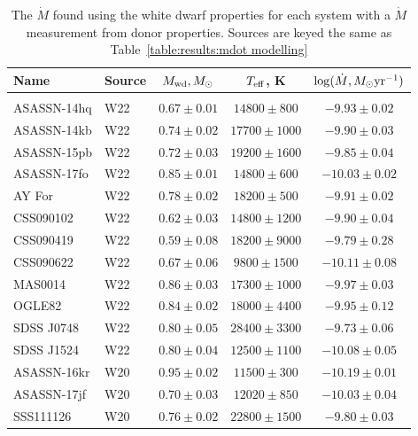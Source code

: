 \begin{table}
    \centering
    \caption{The $\dot M$ found using the white dwarf properties for each system with a $\dot M$ measurement from donor properties. Sources are keyed the same as Table~\ref{table:results:mdot modelling}}
    \label{table:results:Mdot from white dwarf parameters}
    \begin{tabular}{llccc}
        \hline
        \textbf{Name} & \textbf{Source} & \textbf{$M_{\rm wd}, M_\odot$} & \textbf{$T_{\rm eff}$, K} & \textbf{$\log (\dot M, M_\odot {\rm yr}^{-1})$} \\
        \hline \hline \\
        ASASSN-14hq      &  W22  & $0.67 \pm 0.01$ & $14800\pm   800$ & $ -9.93 \pm 0.02$ \\
        ASASSN-14kb      &  W22  & $0.74 \pm 0.02$ & $17700\pm  1000$ & $ -9.90 \pm 0.03$ \\
        ASASSN-15pb      &  W22  & $0.72 \pm 0.03$ & $19200\pm  1600$ & $ -9.85 \pm 0.04$ \\
        ASASSN-17fo      &  W22  & $0.85 \pm 0.01$ & $14800\pm   600$ & $-10.03 \pm 0.02$ \\
        AY For           &  W22  & $0.78 \pm 0.02$ & $18200\pm   500$ & $ -9.91 \pm 0.02$ \\
        CSS090102        &  W22  & $0.62 \pm 0.03$ & $14800\pm  1200$ & $ -9.90 \pm 0.04$ \\
        CSS090419        &  W22  & $0.59 \pm 0.08$ & $18200\pm  9000$ & $ -9.79 \pm 0.28$ \\
        CSS090622        &  W22  & $0.67 \pm 0.06$ & $ 9800\pm  1500$ & $-10.11 \pm 0.08$ \\
        MAS0014          &  W22  & $0.86 \pm 0.03$ & $17300\pm  1000$ & $ -9.97 \pm 0.03$ \\
        OGLE82           &  W22  & $0.84 \pm 0.02$ & $18000\pm  4400$ & $ -9.95 \pm 0.12$ \\
        SDSS J0748       &  W22  & $0.80 \pm 0.05$ & $28400\pm  3300$ & $ -9.73 \pm 0.06$ \\
        SDSS J1524       &  W22  & $0.80 \pm 0.04$ & $12500\pm  1100$ & $-10.08 \pm 0.05$ \\
        ASASSN-16kr      &  W20  & $0.95 \pm 0.02$ & $11500\pm   300$ & $-10.19 \pm 0.01$ \\
        ASASSN-17jf      &  W20  & $0.70 \pm 0.03$ & $12020\pm   850$ & $-10.03 \pm 0.04$ \\
        SSS111126        &  W20  & $0.76 \pm 0.02$ & $22800\pm  1500$ & $ -9.80 \pm 0.03$ \\

\end{tabular}
\end{table}
